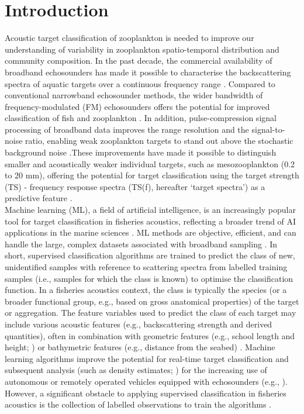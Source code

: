 \section{Introduction}
Acoustic target classification of zooplankton is needed to improve our understanding of variability in zooplankton spatio-temporal distribution and community composition. In the past decade, the commercial availability of broadband echosounders has made it possible to characterise the backscattering spectra of aquatic targets over a continuous frequency range \citep{Bassett2018}. Compared to conventional narrowband echosounder methods, the wider bandwidth of frequency-modulated (FM) echosounders offers the potential for improved classification of fish and zooplankton \citep{BenoitBird2020}. In addition, pulse-compression signal processing of broadband data improves the range resolution and the signal-to-noise ratio, enabling weak zooplankton targets to stand out above the stochastic background noise  \citep{Chu1998, Ehrenberg2000}.These improvements have made it possible to distinguish smaller and acoustically weaker individual targets, such as mesozooplankton (0.2 to 20 mm), offering the potential for target classification using the target strength (TS) - frequency response spectra (TS(f), hereafter `target spectra') as a predictive feature \citep{Bandara2022}. \\
Machine learning (ML), a field of artificial intelligence, is an increasingly popular tool for target classification in fisheries acoustics, reflecting a broader trend of AI applications in the marine sciences \citep{Beyan2020, Malde2020}. ML methods are objective, efficient, and can handle the large, complex datasets associated with broadband sampling \citep{Malde2020}. In short, supervised classification algorithms are trained to predict the class of new, unidentified samples with reference to scattering spectra from labelled training samples (i.e., samples for which the class is known) to optimise the classification function. In a fisheries acoustics context, the class is typically the species (or a broader functional group, e.g., based on gross anatomical properties) of the target or aggregation. The feature variables used to predict the class of each target may include various acoustic features (e.g., backscattering strength and derived quantities), often in combination with geometric features (e.g., school length and height; \citealt{Proud2020}) or bathymetric features (e.g., distance from the seabed)  \citep{Korneliussen2018}. Machine learning algorithms improve the potential for real-time target classification and subsequent analysis (such as density estimates; \citealt{Blackwell2020}) for the increasing use of autonomous or remotely operated vehicles equipped with echosounders (e.g., \citealt{Ludvigsen2018, DeRobertis2019, Malde2020, Dunn2022}). However, a significant obstacle to applying supervised classification in fisheries acoustics is the collection of labelled observations to train the algorithms \citep{Handegard2021}. \\

